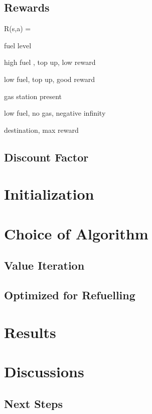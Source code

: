 \documentclass[10pt,twocolumn,letterpaper]{article}
\begin{document}
\subsection{Rewards}

R(s,a) = 

fuel level

high fuel , top up,  low reward

low fuel, top up, good reward

gas station present

low fuel, no gas, negative infinity

destination, max reward


\subsection{Discount Factor}

\section{Initialization}


\section{Choice of Algorithm}
\subsection{Value Iteration}
\subsection{Optimized for Refuelling}

\section{Results}

\section{Discussions}
\subsection{Next Steps}

{\small


}
\end{document}
